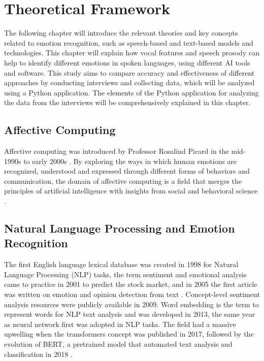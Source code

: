 \chapter{Theoretical Framework}
\label{chap:theoretical-framework}

The following chapter will introduce the relevant theories and key concepts related to emotion recognition, such as speech-based and text-based models and technologies. 
This chapter will explain how vocal features and speech prosody can help to identify different emotions in spoken languages, using different AI tools and software. This study aims to compare accuracy and effectiveness of different approaches by conducting interviews and collecting data, which will be analyzed using a Python application. The elements of the Python application for analyzing the data from the interviews will be comprehensively explained in this chapter.

\section{Affective Computing}

 Affective computing was introduced by Professor Rosalind Picard in the mid-1990s to early 2000s \autocite{Tian2022}. By exploring the ways in which human emotions are recognized, understood and expressed through different forms of behaviors and communication, the domain of affective computing is a field that merges the principles of artificial intelligence with insights from social and behavioral science \autocite{Tian2022}.

\section{Natural Language Processing and Emotion Recognition}
The first English language lexical database was created in 1998 for Natural Language Processing (NLP) tasks, the term sentiment and emotional analysis came to practice in 2001 to predict the stock market, and in 2005 the first article was written on emotion and opinion detection from text \autocite{Kusal2023}. Concept-level sentiment analysis resources were publicly available in 2009. Word embedding is the term to represent words for NLP text analysis and was developed in 2013, the same year as neural network first was adopted in NLP tasks. The field had a massive upwelling when the transformers concept was published in 2017, followed by the evolution of BERT, a pretrained model that automated text analysis and classification in 2018 \autocite{Kusal2023}. 

